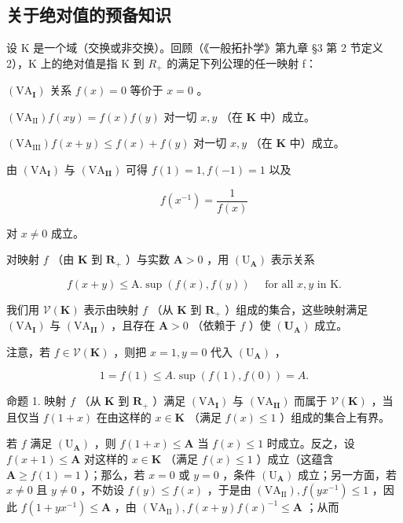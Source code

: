 \subsection{关于绝对值的预备知识}

设 K 是一个域（交换或非交换）。回顾（《一般拓扑学》第九章 §3 第 2 节定义 2），K 上的绝对值是指 K 到 \(R_{+}\) 的满足下列公理的任一映射 f：

\((\mathrm{VA}_{\mathbf{I}})\) 关系 \(f(x) = 0\) 等价于 \(x = 0\) 。

\((\mathrm{VA}_{\mathrm{II}}) f(xy) = f(x)f(y)\) 对一切 \(x, y\) （在 \(\mathbf{K}\) 中）成立。

\((\mathrm{VA}_{\mathrm{III}}) f(x + y) \leqslant f(x) + f(y)\) 对一切 \(x, y\) （在 \(\mathbf{K}\) 中）成立。

由 \((\mathrm{VA}_{\mathbf{I}})\) 与 \((\mathrm{VA}_{\mathbf{II}})\) 可得 \(f(1) = 1, f(-1) = 1\) 以及

\[
f (x ^ {- 1}) = \frac {1}{f (x)}
\]

对 \(x \neq 0\) 成立。

对映射 \(f\) （由 \(\mathbf{K}\) 到 \(\mathbf{R}_{+}\) ）与实数 \(\mathbf{A} > 0\) ，用 \((\mathrm{U}_{\mathbf{A}})\) 表示关系

\[
f (x + y) \leqslant \mathrm{A}. \sup (f (x), f (y)) \quad \text {   for   all   } x, y \text {   in   } \mathrm{K}.
\]

我们用 \(\mathcal{V}(\mathbf{K})\) 表示由映射 \(f\) （从 \(\mathbf{K}\) 到 \(\mathbf{R}_{+}\) ）组成的集合，这些映射满足 \((\mathrm{VA}_{\mathbf{I}})\) 与 \((\mathrm{VA}_{\mathbf{II}})\) ，且存在 \(\mathbf{A} > 0\) （依赖于 \(f\) ）使 \((\mathbf{U}_{\mathbf{A}})\) 成立。

注意，若 \(f \in \mathcal{V}(\mathbf{K})\) ，则把 \(x = 1, y = 0\) 代入 \((\mathrm{U}_{\mathbf{A}})\) ，

\[
1 = f (1) \leqslant A. \sup (f (1), f (0)) = A.
\]

命题 1. 映射 \(f\) （从 \(\mathbf{K}\) 到 \(\mathbf{R}_+\) ）满足 \((\mathrm{VA}_{\mathbf{I}})\) 与 \((\mathrm{VA}_{\mathbf{II}})\) 而属于 \(\mathcal{V}(\mathbf{K})\) ，当且仅当 \(f(1 + x)\) 在由这样的 \(x \in \mathbf{K}\) （满足 \(f(x) \leqslant 1\) ）组成的集合上有界。

若 \(f\) 满足 \((\mathrm{U}_{\mathbf{A}})\) ，则 \(f(1 + x) \leqslant \mathbf{A}\) 当 \(f(x) \leqslant 1\) 时成立。反之，设 \(f(x + 1) \leqslant \mathbf{A}\) 对这样的 \(x \in \mathbf{K}\) （满足 \(f(x) \leqslant 1\) ）成立（这蕴含 \(\mathbf{A} \geqslant f(1) = 1\) ）；那么，若 \(x = 0\) 或 \(y = 0\) ，条件 \((\mathrm{U}_{\mathbf{A}})\) 成立；另一方面，若 \(x \neq 0\) 且 \(y \neq 0\) ，不妨设 \(f(y) \leqslant f(x)\) ，于是由 \((\mathrm{VA}_{\mathrm{II}}), f(yx^{-1}) \leqslant 1\) ，因此 \(f(1 + yx^{-1}) \leqslant \mathbf{A}\) ，由 \((\mathrm{VA}_{\mathrm{II}}), f(x + y)f(x)^{-1} \leqslant \mathbf{A}\) ；从而

